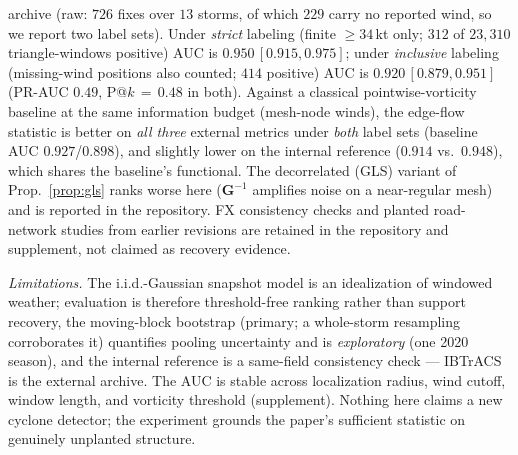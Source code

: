 \documentclass{article}
\begin{document}
archive \cite{knapp2010ibtracs} (raw: $726$ fixes over $13$ storms, of which
$229$ carry no reported wind, so we report two label sets). Under
\emph{strict} labeling (finite $\ge34$\,kt only; $312$ of $23{,}310$
triangle-windows positive) AUC is $0.950\,[0.915,0.975]$; under
\emph{inclusive} labeling (missing-wind positions also counted; $414$ positive)
AUC is $0.920\,[0.879,0.951]$ (PR-AUC $0.49$, P@$k\,{=}\,0.48$ in both). Against
a classical pointwise-vorticity baseline at the same information budget
(mesh-node winds), the edge-flow statistic is better on \emph{all three}
external metrics under \emph{both} label sets (baseline AUC $0.927$/$0.898$),
and slightly lower on the internal reference ($0.914$ vs.\ $0.948$), which
shares the baseline's functional. The decorrelated (GLS) variant of Prop.~\ref{prop:gls}
ranks worse here ($\bm G^{-1}$ amplifies noise on a near-regular mesh) and
is reported in the repository. FX consistency checks and planted road-network
studies from earlier revisions are retained in the repository and
supplement, not claimed as recovery evidence.

\smallskip\noindent\emph{Limitations.} The i.i.d.-Gaussian snapshot model is
an idealization of windowed weather; evaluation is therefore threshold-free
ranking rather than support recovery, the moving-block bootstrap (primary; a
whole-storm resampling corroborates it) quantifies pooling uncertainty and is
\emph{exploratory} (one 2020 season), and the internal reference is a
same-field consistency check --- IBTrACS is the external archive. The AUC is
stable across localization radius, wind cutoff, window length, and vorticity
threshold (supplement). Nothing here claims a new cyclone detector; the experiment grounds the
paper's sufficient statistic on genuinely unplanted structure.
\end{document}
